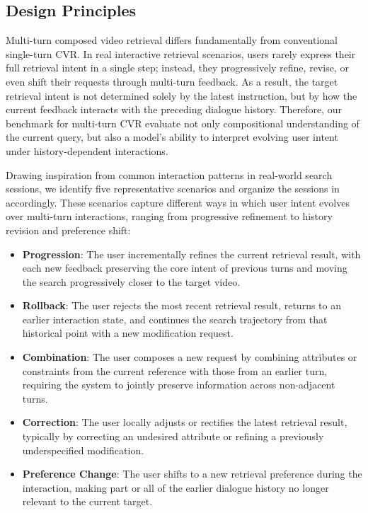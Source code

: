 \subsection{Design Principles} 
Multi-turn composed video retrieval differs fundamentally from conventional single-turn CVR. In real interactive retrieval scenarios, users rarely express their full retrieval intent in a single step; instead, they progressively refine, revise, or even shift their requests through multi-turn feedback. As a result, the target retrieval intent is not determined solely by the latest instruction, but by how the current feedback interacts with the preceding dialogue history. Therefore, our benchmark for multi-turn CVR evaluate not only compositional understanding of the current query, but also a model’s ability to interpret evolving user intent under history-dependent interactions.

Drawing inspiration from common interaction patterns in real-world search sessions, we identify five representative scenarios and organize the sessions in \Mybenchmark accordingly. These scenarios capture different ways in which user intent evolves over multi-turn interactions, ranging from progressive refinement to history revision and preference shift: 

\begin{itemize}
    \item \textbf{Progression}: The user incrementally refines the current retrieval result, with each new feedback preserving the core intent of previous turns and moving the search progressively closer to the target video. 
    \item \textbf{Rollback}: The user rejects the most recent retrieval result, returns to an earlier interaction state, and continues the search trajectory from that historical point with a new modification request. 
    \item \textbf{Combination}: The user composes a new request by combining attributes or constraints from the current reference with those from an earlier turn, requiring the system to jointly preserve information across non-adjacent turns. 
    \item \textbf{Correction}: The user locally adjusts or rectifies the latest retrieval result, typically by correcting an undesired attribute or refining a previously underspecified modification. 
    \item \textbf{Preference Change}: The user shifts to a new retrieval preference during the interaction, making part or all of the earlier dialogue history no longer relevant to the current target. 
\end{itemize}

